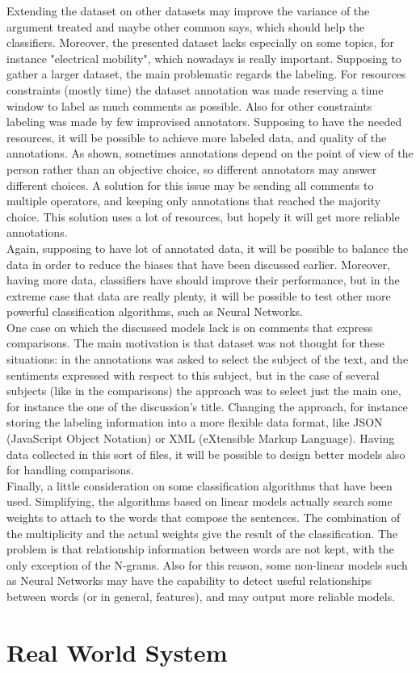 Extending the dataset on other datasets may improve the variance of the argument treated and maybe other common says, which should help the classifiers. Moreover, the presented dataset lacks especially on some topics, for instance "electrical mobility", which nowadays is really important. Supposing to gather a larger dataset, the main problematic regards the labeling. For resources constraints (mostly time) the dataset annotation was made reserving a time window to label as much comments as possible. Also for other constraints labeling was made by few improvised annotators. Supposing to have the needed resources, it will be possible to achieve more labeled data, and quality of the annotations. As shown, sometimes annotations depend on the point of view of the person rather than an objective choice, so different annotators may answer different choices. A solution for this issue may be sending all comments to multiple operators, and keeping only annotations that reached the majority choice. This solution uses a lot of resources, but hopely it will get more reliable annotations.\\
Again, supposing to have lot of annotated data, it will be possible to balance the data in order to reduce the biases that have been discussed earlier. Moreover, having more data, classifiers have should improve their performance, but in the extreme case that data are really plenty, it will be possible to test other more powerful classification algorithms, such as Neural Networks.\\
One case on which the discussed models lack is on comments that express comparisons. The main motivation is that dataset was not thought for these situations: in the annotations was asked to select the subject of the text, and the sentiments expressed with respect to this subject, but in the case of several subjects (like in the comparisons) the approach was to select just the main one, for instance the one of the discussion's title. Changing the approach, for instance storing the labeling information into a more flexible data format, like JSON (JavaScript Object Notation) or XML (eXtensible Markup Language). Having data collected in this sort of files, it will be possible to design better models also for handling comparisons.\\
Finally, a little consideration on some classification algorithms that have been used. Simplifying, the algorithms based on linear models actually search some weights to attach to the words that compose the sentences. The combination of the multiplicity and the actual weights give the result of the classification. The problem is that relationship information between words are not kept, with the only exception of the N-grams. Also for this reason, some non-linear models such as Neural Networks may have the capability to detect useful relationships between words (or in general, features), and may output more reliable models.


\section{Real World System}




